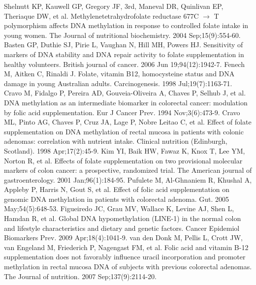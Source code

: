 \begin{thebibliography}{12}
		Shelnutt KP, Kauwell GP, Gregory JF, 3rd, Maneval DR, Quinlivan EP, Theriaque DW, et al. Methylenetetrahydrofolate reductase 677C $\rightarrow$ T polymorphism affects DNA methylation in response to controlled folate intake in young women. The Journal of nutritional biochemistry. 2004 Sep;15(9):554-60. 
		Basten GP, Duthie SJ, Pirie L, Vaughan N, Hill MH, Powers HJ. Sensitivity of markers of DNA stability and DNA repair activity to folate supplementation in healthy volunteers. British journal of cancer. 2006 Jun 19;94(12):1942-7. 
		Fenech M, Aitken C, Rinaldi J. Folate, vitamin B12, homocysteine status and DNA damage in young Australian adults. Carcinogenesis. 1998 Jul;19(7):1163-71. 
		Cravo M, Fidalgo P, Pereira AD, Gouveia-Oliveira A, Chaves P, Selhub J, et al. DNA methylation as an intermediate biomarker in colorectal cancer: modulation by folic acid supplementation. Eur J Cancer Prev. 1994 Nov;3(6):473-9. 
		Cravo ML, Pinto AG, Chaves P, Cruz JA, Lage P, Nobre Leitao C, et al. Effect of folate supplementation on DNA methylation of rectal mucosa in patients with colonic adenomas: correlation with nutrient intake. Clinical nutrition (Edinburgh, Scotland). 1998 Apr;17(2):45-9. 
		Kim YI, Baik HW, Fawaz K, Knox T, Lee YM, Norton R, et al. Effects of folate supplementation on two provisional molecular markers of colon cancer: a prospective, randomized trial. The American journal of gastroenterology. 2001 Jan;96(1):184-95. 
		Pufulete M, Al-Ghnaniem R, Khushal A, Appleby P, Harris N, Gout S, et al. Effect of folic acid supplementation on genomic DNA methylation in patients with colorectal adenoma. Gut. 2005 May;54(5):648-53. 
		Figueiredo JC, Grau MV, Wallace K, Levine AJ, Shen L, Hamdan R, et al. Global DNA hypomethylation (LINE-1) in the normal colon and lifestyle characteristics and dietary and genetic factors. Cancer Epidemiol Biomarkers Prev. 2009 Apr;18(4):1041-9. 
		van den Donk M, Pellis L, Crott JW, van Engeland M, Friederich P, Nagengast FM, et al. Folic acid and vitamin B-12 supplementation does not favorably influence uracil incorporation and promoter methylation in rectal mucosa DNA of subjects with previous colorectal adenomas. The Journal of nutrition. 2007 Sep;137(9):2114-20. 
\end{thebibliography} 
